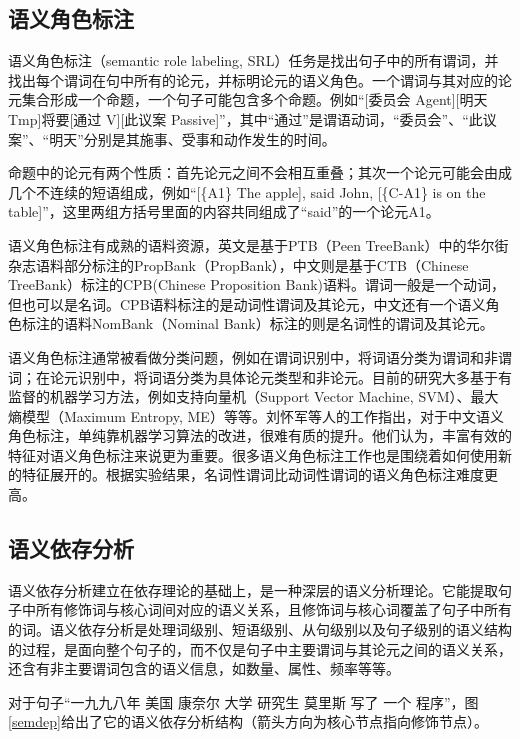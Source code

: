 \documentclass[master, winfont]{njuthesis}
\begin{document}
\subsection{语义角色标注}
语义角色标注（semantic role labeling, SRL）任务是找出句子中的所有谓词，并找出每个谓词在句中所有的论元，并标明论元的语义角色。一个谓词与其对应的论元集合形成一个命题，一个句子可能包含多个命题。例如“[委员会 Agent][明天 Tmp]将要[通过 V][此议案 Passive]”，其中“通过”是谓语动词，“委员会”、“此议案”、“明天”分别是其施事、受事和动作发生的时间\cite{LiuHJ2007}。

命题中的论元有两个性质：首先论元之间不会相互重叠；其次一个论元可能会由成几个不连续的短语组成，例如“[\{A1\} The apple], said John, [\{C-A1\} is on the table]”，这里两组方括号里面的内容共同组成了“said”的一个论元A1\cite{Carreras2004Introduction}。

语义角色标注有成熟的语料资源，英文是基于PTB（Peen TreeBank）中的华尔街杂志语料部分标注的PropBank（PropBank）\cite{Palmer2006The}，中文则是基于CTB（Chinese TreeBank）标注的CPB(Chinese Proposition Bank)语料\cite{Xue2003Annotating}。谓词一般是一个动词，但也可以是名词。CPB语料标注的是动词性谓词及其论元，中文还有一个语义角色标注的语料NomBank（Nominal Bank）标注的则是名词性的谓词及其论元。

语义角色标注通常被看做分类问题，例如在谓词识别中，将词语分类为谓词和非谓词；在论元识别中，将词语分类为具体论元类型和非论元。目前的研究大多基于有监督的机器学习方法，例如支持向量机（Support Vector Machine, SVM）\cite{Pradhan2005Support}、最大熵模型（Maximum Entropy, ME）\cite{Kwon2004Senseval}等等。刘怀军等人的工作\cite{LiuHJ2007}指出，对于中文语义角色标注，单纯靠机器学习算法的改进，很难有质的提升。他们认为，丰富有效的特征对语义角色标注来说更为重要。很多语义角色标注工作也是围绕着如何使用新的特征展开的。根据实验结果，名词性谓词比动词性谓词的语义角色标注难度更高。

\subsection{语义依存分析}
 语义依存分析建立在依存理论的基础上，是一种深层的语义分析理论。它能提取句子中所有修饰词与核心词间对应的语义关系，且修饰词与核心词覆盖了句子中所有的词。语义依存分析是处理词级别、短语级别、从句级别以及句子级别的语义结构的过程，是面向整个句子的，而不仅是句子中主要谓词与其论元之间的语义关系，还含有非主要谓词包含的语义信息，如数量、属性、频率等等\cite{GuoJiang2011}。
 
 对于句子“一九九八年 美国 康奈尔 大学 研究生 莫里斯 写了 一个 程序”，图\ref{semdep}给出了它的语义依存分析结构（箭头方向为核心节点指向修饰节点）。
 
\end{document}
